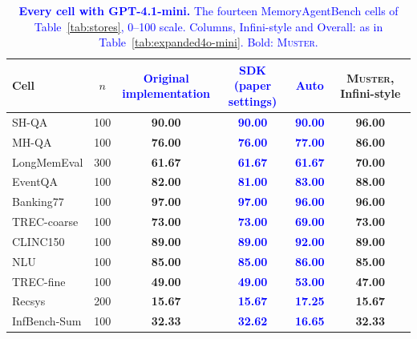 \documentclass{article}
\newcommand{\nativechange}[1]{\textcolor{blue}{#1}}
\newcommand{\tabfont}{\fontsize{7.5}{8.5}\selectfont\renewcommand{\arraystretch}{1.0}}
\newcommand{\sys}{\textsc{Muster}}
\begin{document}
\begin{table}[!htbp]
\centering\tabfont
\caption{\nativechange{\textbf{Every cell with GPT-4.1-mini.} The fourteen MemoryAgentBench cells of Table~\ref{tab:stores}, 0--100 scale. Columns, Infini-style and Overall: as in Table~\ref{tab:expanded4o-mini}. Bold: \sys{}.}}
\label{tab:expanded4.1-mini}
\setlength{\tabcolsep}{4pt}\setlength{\aboverulesep}{0pt}\setlength{\belowrulesep}{0pt}\setlength{\extrarowheight}{0.8pt}
\begin{tabular}{lc>{\columncolor{oursbg}}c>{\columncolor{oursbg}}c>{\columncolor{oursbg}}c>{\columncolor{oursbg}}c}
\toprule
Cell & $n$ & \shortstack{\nativechange{\textbf{Original}}\\\nativechange{\textbf{implementation}}} & \shortstack{\nativechange{\textbf{SDK}}\\\nativechange{\textbf{(paper settings)}}} & \nativechange{\textbf{Auto}} & \textbf{\sys{}, Infini-style} \\
\midrule
SH-QA & 100 & \textbf{90.00} & \nativechange{\textbf{90.00}} & \nativechange{\textbf{90.00}} & \textbf{96.00} \\
MH-QA & 100 & \textbf{76.00} & \nativechange{\textbf{76.00}} & \nativechange{\textbf{77.00}} & \textbf{86.00} \\
LongMemEval & 300 & \textbf{61.67} & \nativechange{\textbf{61.67}} & \nativechange{\textbf{61.67}} & \textbf{70.00} \\
EventQA & 100 & \textbf{82.00} & \nativechange{\textbf{81.00}} & \nativechange{\textbf{83.00}} & \textbf{88.00} \\
Banking77 & 100 & \textbf{97.00} & \nativechange{\textbf{97.00}} & \nativechange{\textbf{96.00}} & \textbf{96.00} \\
TREC-coarse & 100 & \textbf{73.00} & \nativechange{\textbf{73.00}} & \nativechange{\textbf{69.00}} & \textbf{73.00} \\
CLINC150 & 100 & \textbf{89.00} & \nativechange{\textbf{89.00}} & \nativechange{\textbf{92.00}} & \textbf{89.00} \\
NLU & 100 & \textbf{85.00} & \nativechange{\textbf{85.00}} & \nativechange{\textbf{86.00}} & \textbf{85.00} \\
TREC-fine & 100 & \textbf{49.00} & \nativechange{\textbf{49.00}} & \nativechange{\textbf{53.00}} & \textbf{47.00} \\
Recsys & 200 & \textbf{15.67} & \nativechange{\textbf{15.67}} & \nativechange{\textbf{17.25}} & \textbf{15.67} \\
InfBench-Sum & 100 & \textbf{32.33} & \nativechange{\textbf{32.62}} & \nativechange{\textbf{16.65}} & \textbf{32.33} \\

\end{tabular}
\end{table}
\end{document}
